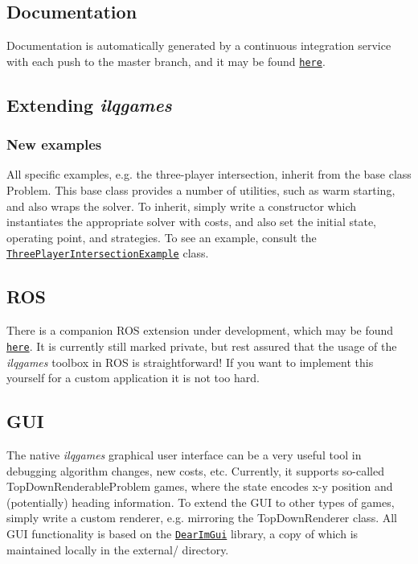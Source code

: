 \subsection*{Documentation}

Documentation is automatically generated by a continuous integration service with each push to the {\ttfamily master} branch, and it may be found \href{https://HJReachability.github.io/ilqgames/documentation/html/}{\tt here}.

\subsection*{Extending {\itshape ilqgames}}

\subsubsection*{New examples}

All specific examples, e.\+g. the three-\/player intersection, inherit from the base class {\ttfamily Problem}. This base class provides a number of utilities, such as warm starting, and also wraps the solver. To inherit, simply write a constructor which instantiates the appropriate solver with costs, and also set the initial state, operating point, and strategies. To see an example, consult the \href{https://github.com/HJReachability/ilqgames/blob/master/src/three_player_intersection_example.cpp}{\tt Three\+Player\+Intersection\+Example} class.

\subsection*{R\+OS}

There is a companion R\+OS extension under development, which may be found \href{https://github.com/HJReachability/ilqgames_ros}{\tt here}. It is currently still marked private, but rest assured that the usage of the {\itshape ilqgames} toolbox in R\+OS is straightforward! If you want to implement this yourself for a custom application it is not too hard.

\subsection*{G\+UI}

The native {\itshape ilqgames} graphical user interface can be a very useful tool in debugging algorithm changes, new costs, etc. Currently, it supports so-\/called {\ttfamily Top\+Down\+Renderable\+Problem} games, where the state encodes x-\/y position and (potentially) heading information. To extend the G\+UI to other types of games, simply write a custom renderer, e.\+g. mirroring the {\ttfamily Top\+Down\+Renderer} class. All G\+UI functionality is based on the \href{https://github.com/ocornut/imgui}{\tt Dear\+Im\+Gui} library, a copy of which is maintained locally in the {\ttfamily external/} directory. 